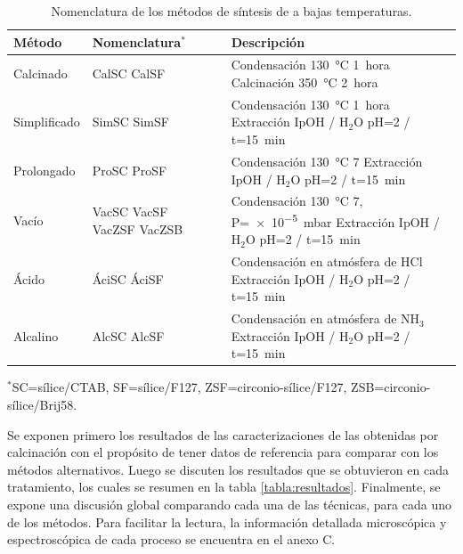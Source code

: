 		 	\begin{table}[b!] 
		 	 \caption[Tratamientos alternativos de síntesis de \pdm]{Nomenclatura de los métodos de síntesis de \pdm\space a bajas temperaturas.}
			 \begin{tabular}{>{\raggedright\arraybackslash}m{1.9cm}>{\centering\arraybackslash}m{1cm}>{\raggedright\arraybackslash}m{0.9cm}>{\raggedright\arraybackslash}m{6.62cm}} 
			 \toprule
				 Método   &  Nomenclatura$^*$&  & Descripción \\ \midrule
				 Calcinado & CalSC CalSF& &  Condensación \SI{130}{\celsius} \SI{1}{hora}\hspace{2cm} Calcinación \SI{350}{\celsius} \SI{2}{hora}\hspace{2cm} \\ \midrule
				 Simplificado & SimSC SimSF& &  Condensación \SI{130}{\celsius} \SI{1}{hora}\hspace{2cm} Extracción IpOH / H$_2$O pH=2 / t=\SI{15}{min}\\ \midrule
				 Prolongado & ProSC ProSF& & Condensación \SI{130}{\celsius} \SI{7}{\text{días}}\hspace{2cm} Extracción IpOH / H$_2$O pH=2 / t=\SI{15}{min} \\ \midrule				
				 Vacío & VacSC VacSF VacZSF VacZSB& &  Condensación \SI{130}{\celsius} \SI{7}{\text{días}}, P=\SI{e-5}{\milli\bar}\hspace{2cm} Extracción IpOH / H$_2$O pH=2 / t=\SI{15}{min}\\ \midrule
				 Ácido & ÁciSC ÁciSF& &  Condensación en atmósfera de HCl\hspace{2cm} Extracción IpOH / H$_2$O pH=2 / t=\SI{15}{min}\\ \midrule
				 Alcalino & AlcSC AlcSF& & Condensación en atmósfera de NH$_3$\hspace{2cm} Extracción IpOH / H$_2$O pH=2 / t=\SI{15}{min}\\ 
				\bottomrule
				   \end{tabular}\vspace*{2pt}
		    	  	\footnotesize{$^*$SC=sílice/CTAB, SF=sílice/F127, ZSF=circonio-sílice/F127, ZSB=circonio-sílice/Brij58.}
				   	\label{tabla:tratamientos}
				   \end{table}

		 Se exponen primero los resultados de las caracterizaciones de las \pdm\space obtenidas por calcinación con el propósito de tener datos de referencia para comparar con los métodos alternativos. Luego se discuten los resultados que se obtuvieron en cada tratamiento, los cuales se resumen en la tabla \ref{tabla:resultados}. Finalmente, se expone una discusión global comparando cada una de las técnicas, para cada uno de los métodos. Para facilitar la lectura, la información detallada microscópica y espectroscópica de cada proceso se encuentra en el anexo C.
	 
